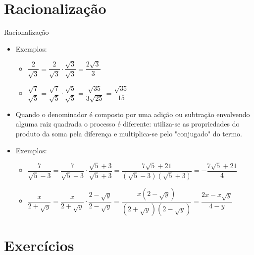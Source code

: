 \documentclass[14pt, aspectratio=169]{beamer}
\newcommand{\skipframe}{\vspace{10.0cm}}
\begin{document}
\section{Racionalização}

\begin{frame}[allowframebreaks]{Racionalização}

\begin{itemize}
    \item Exemplos:
    \begin{itemize}
        \item $\dfrac{2}{\sqrt{3}} = \dfrac{2}{\sqrt{3}} \cdot \dfrac{\sqrt{3}}{\sqrt{3}} = \dfrac{2\sqrt{3}}{3}$
        \vspace{0.25cm}
        \item $\dfrac{\sqrt{7}}{\sqrt{5}} = \dfrac{\sqrt{7}}{\sqrt{5}} \cdot \dfrac{\sqrt{5}}{\sqrt{5}} = \dfrac{\sqrt{35}}{3\sqrt{25}} = \dfrac{\sqrt{35}}{15}$
    \end{itemize}

    \skipframe

    \item Quando o denominador é composto por uma adição ou subtração envolvendo alguma raiz quadrada o processo é diferente: utiliza-se as propriedades do produto da soma pela diferença e multiplica-se pelo "conjugado" do termo.

    \skipframe

    \item Exemplos:
    \begin{itemize}
        \item $\dfrac{7}{\sqrt{5}-3} = \dfrac{7}{\sqrt{5}-3} \cdot \dfrac{\sqrt{5}+3}{\sqrt{5}+3} = \dfrac{7\sqrt{5}+21}{(\sqrt{5}-3)(\sqrt{5}+3)} = -\dfrac{7\sqrt{5}+21}{4}$
        \vspace{0.25cm}
        \item $\dfrac{x}{2 + \sqrt{y}} = \dfrac{x}{2 + \sqrt{y}} \cdot \dfrac{2-\sqrt{y}}{2-\sqrt{y}} = \dfrac{x(2-\sqrt{y})}{(2+\sqrt{y})(2-\sqrt{y})}=\dfrac{2x-x\sqrt{y}}{4-y}$
    \end{itemize}
    
\end{itemize}
    
\end{frame}

\section{Exercícios}
\end{document}
